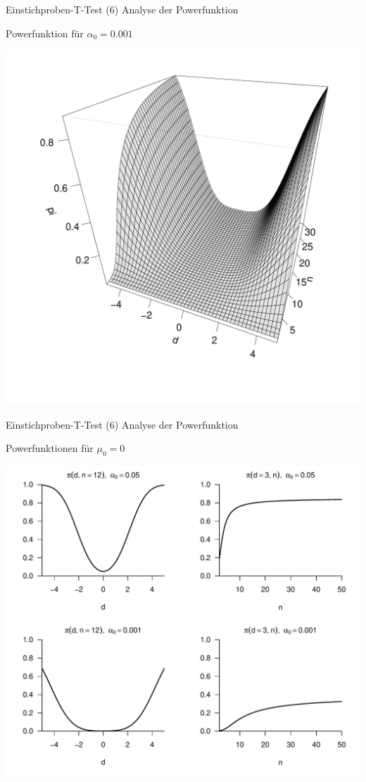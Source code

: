 \documentclass[
  8pt,
  ignorenonframetext,
]{beamer}
\begin{document}
\begin{frame}{Einstichproben-T-Test \textbar{} (6) Analyse der
Powerfunktion}
\protect\hypertarget{einstichproben-t-test-6-analyse-der-powerfunktion-2}{}
\small

Powerfunktion für \(\alpha_0 = 0.001\)

\begin{center}\includegraphics[width=0.6\linewidth]{12_Abbildungen/wtfi_12_t_test_ungerichtet_power_0001} \end{center}
\end{frame}

\begin{frame}{Einstichproben-T-Test \textbar{} (6) Analyse der
Powerfunktion}
\protect\hypertarget{einstichproben-t-test-6-analyse-der-powerfunktion-3}{}
\small
\justifying

Powerfunktionen für \(\mu_0 = 0\) \vspace{2mm}

\begin{center}\includegraphics[width=0.7\linewidth]{12_Abbildungen/wtfi_12_t_test_ungerichtet_powerfunktionen} \end{center}
\end{frame}
\end{document}
